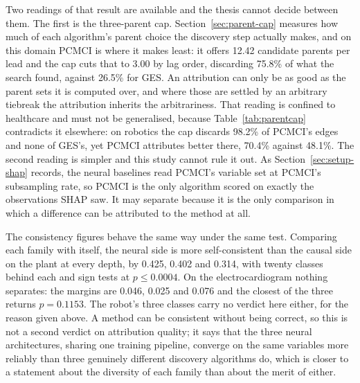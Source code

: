 Two readings of that result are available and the thesis cannot decide between them. The first is the three-parent cap. Section~\ref{sec:parent-cap} measures how much of each algorithm's parent choice the discovery step actually makes, and on this domain PCMCI is where it makes least: it offers 12.42 candidate parents per lead and the cap cuts that to 3.00 by lag order, discarding 75.8\% of what the search found, against 26.5\% for GES. An attribution can only be as good as the parent sets it is computed over, and where those are settled by an arbitrary tiebreak the attribution inherits the arbitrariness. That reading is confined to healthcare and must not be generalised, because Table~\ref{tab:parentcap} contradicts it elsewhere: on robotics the cap discards 98.2\% of PCMCI's edges and none of GES's, yet PCMCI attributes better there, 70.4\% against 48.1\%. The second reading is simpler and this study cannot rule it out. As Section~\ref{sec:setup-shap} records, the neural baselines read PCMCI's variable set at PCMCI's subsampling rate, so PCMCI is the only algorithm scored on exactly the observations SHAP saw. It may separate because it is the only comparison in which a difference can be attributed to the method at all.

The consistency figures behave the same way under the same test. Comparing each family with itself, the neural side is more self-consistent than the causal side on the plant at every depth, by 0.425, 0.402 and 0.314, with twenty classes behind each and sign tests at $p \leq 0.0004$. On the electrocardiogram nothing separates: the margins are 0.046, 0.025 and 0.076 and the closest of the three returns $p = 0.1153$. The robot's three classes carry no verdict here either, for the reason given above. A method can be consistent without being correct, so this is not a second verdict on attribution quality; it says that the three neural architectures, sharing one training pipeline, converge on the same variables more reliably than three genuinely different discovery algorithms do, which is closer to a statement about the diversity of each family than about the merit of either.

